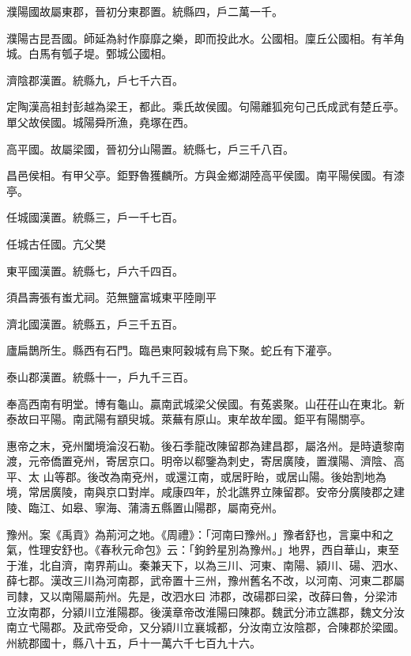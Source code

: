 \begin{pinyinscope}
 濮陽國故屬東郡，晉初分東郡置。統縣四，戶二萬一千。



 濮陽古昆吾國。師延為紂作靡靡之樂，即而投此水。公國相。廩丘公國相。有羊角城。白馬有瓠子堤。鄄城公國相。



 濟陰郡漢置。統縣九，戶七千六百。



 定陶漢高祖封彭越為梁王，都此。乘氏故侯國。句陽離狐宛句己氏成武有楚丘亭。單父故侯國。城陽舜所漁，堯塚在西。



 高平國。故屬梁國，晉初分山陽置。統縣七，戶三千八百。



 昌邑侯相。有甲父亭。鉅野魯獲麟所。方與金鄉湖陸高平侯國。南平陽侯國。有漆亭。



 任城國漢置。統縣三，戶一千七百。



 任城古任國。亢父樊



 東平國漢置。統縣七，戶六千四百。



 須昌壽張有蚩尤祠。范無鹽富城東平陸剛平



 濟北國漢置。統縣五，戶三千五百。



 廬扁鵲所生。縣西有石門。臨邑東阿穀城有烏下聚。蛇丘有下灌亭。



 泰山郡漢置。統縣十一，戶九千三百。



 奉高西南有明堂。博有龜山。贏南武城梁父侯國。有菟裘聚。山茌茌山在東北。新泰故曰平陽。南武陽有顓臾城。萊蕪有原山。東牟故牟國。鉅平有陽關亭。



 惠帝之末，兗州闔境淪沒石勒。後石季龍改陳留郡為建昌郡，屬洛州。是時遺黎南渡，元帝僑置兗州，寄居京口。明帝以郗鑒為刺史，寄居廣陵，置濮陽、濟陰、高平、太
 山等郡。後改為南兗州，或還江南，或居盱眙，或居山陽。後始割地為境，常居廣陵，南與京口對岸。咸康四年，於北譙界立陳留郡。安帝分廣陵郡之建陵、臨江、如皋、寧海、蒲濤五縣置山陽郡，屬南兗州。



 豫州。案《禹貢》為荊河之地。《周禮》：「河南曰豫州。」豫者舒也，言稟中和之氣，性理安舒也。《春秋元命包》云：「鉤鈐星別為豫州。」地界，西自華山，東至于淮，北自濟，南界荊山。秦兼天下，以為三川、河東、南陽、潁川、碭、泗水、薛七郡。漢改三川為河南郡，武帝置十三州，豫州舊名不改，以河南、河東二郡屬司隸，又以南陽屬荊州。先是，改泗水曰
 沛郡，改碭郡曰梁，改薛曰魯，分梁沛立汝南郡，分潁川立淮陽郡。後漢章帝改淮陽曰陳郡。魏武分沛立譙郡，魏文分汝南立弋陽郡。及武帝受命，又分潁川立襄城都，分汝南立汝陰郡，合陳郡於梁國。州統郡國十，縣八十五，戶十一萬六千七百九十六。




\end{pinyinscope}
